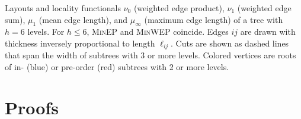 \documentclass[10pt,conference,letterpaper]{IEEEtran}
\newcommand{\pmean}[1][p]{\ensuremath{\mu_{#1}}\xspace}
\newcommand{\pwmean}[1][p]{\ensuremath{\nu_{#1}}\xspace}
\newcommand{\minep}{\textsc{MinEP}\xspace}
\newcommand{\minwep}{\textsc{MinWEP}\xspace}
\newcommand{\len}[1][]{\ensuremath{\ell_{#1}}\xspace}
\begin{document}
\begin{figure*}[tp]
{  Layouts and locality functionals
  \pwmean[0] (weighted edge product),
  \pwmean[1] (weighted edge sum),
  \pmean[1] (mean edge length),
  and \pmean[\infty] (maximum edge length)
  of a tree with $h = 6$ levels.
  For $h \leq 6$, \minep and \minwep coincide.
  Edges $ij$ are drawn with thickness inversely proportional to length \len[ij].
  Cuts are shown as dashed lines that span the width of subtrees with 3 or more levels.
  Colored vertices are roots of in- (blue) or pre-order (red) subtrees with 2 or more levels.
}
\label{fig:tree-layouts}\end{figure*}
 
\clearpage

\clearpage

\appendix

\section{Proofs}
\label{sec:proofs}
\end{document}

